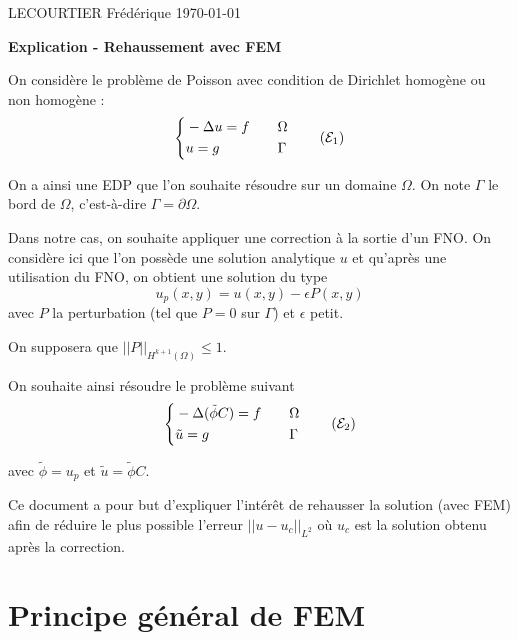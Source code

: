 \documentclass[french]{article}
\begin{document}
	LECOURTIER Frédérique \hfill \today
	\begin{center}
		\Large\textbf{{Explication - Rehaussement avec FEM}}\\
	\end{center}
	\graphicspath{{images/}}

	On considère le problème de Poisson avec condition de Dirichlet homogène ou non homogène :
	\begin{equation}
		\label{pb1}
		\left\{\begin{aligned}
			&-\Delta u=f \quad &&\Omega \\
			&u=g \quad &&\Gamma
		\end{aligned}\right. \tag{$\mathcal{E}_1$}
	\end{equation}

	On a ainsi une EDP que l'on souhaite résoudre sur un domaine $\Omega$. On note $\Gamma$ le bord de $\Omega$, c'est-à-dire $\Gamma=\partial\Omega$. 
	
	Dans notre cas, on souhaite appliquer une correction à la sortie d'un FNO.
	On considère ici que l'on possède une solution analytique $u$ et qu'après une utilisation du FNO, on obtient une solution du type
	\begin{equation}
		\label{phi_tild}
		u_p(x,y) = u(x,y)-\epsilon P(x,y)
	\end{equation}
	avec $P$ la perturbation (tel que $P=0$ sur $\Gamma$) et $\epsilon$ petit.
	
	On supposera que $||P||_{H^{k+1}(\Omega)}\le 1$.
	
	On souhaite ainsi résoudre le problème suivant
	\begin{equation}
		\label{pb2}
		\left\{\begin{aligned}
			&-\Delta (\tilde{\phi}C)=f \quad &&\Omega \\
			&\tilde{u}=g \quad &&\Gamma
		\end{aligned}\right. \tag{$\mathcal{E}_2$}
	\end{equation}
	
	avec $\tilde{\phi}=u_p$ et $\tilde{u}=\tilde{\phi}C$.
	
	Ce document a pour but d'expliquer l'intérêt de rehausser la solution (avec FEM) afin de réduire le plus possible l'erreur $||u-u_{c}||_{L^2}$ où $u_{c}$ est la solution obtenu après la correction.
	
	\section*{Principe général de FEM}
	
\end{document}

